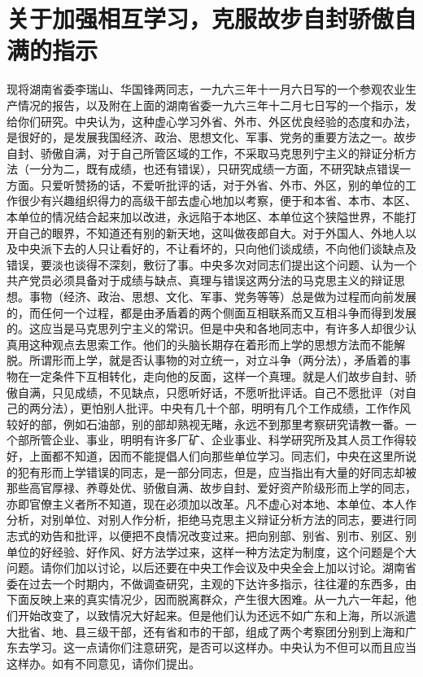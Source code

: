 \section[关于加强相互学习，克服故步自封骄傲自满的指示（一九六三年十二月十三日）]{关于加强相互学习，克服故步自封骄傲自满的指示}


现将湖南省委李瑞山、华国锋两同志，一九六三年十一月六日写的一个参观农业生产情况的报告，以及附在上面的湖南省委一九六三年十二月七日写的一个指示，发给你们研究。中央认为，这种虚心学习外省、外市、外区优良经验的态度和办法，是很好的，是发展我国经济、政治、思想文化、军事、党务的重要方法之一。故步自封、骄傲自满，对于自己所管区域的工作，不采取马克思列宁主义的辩证分析方法（一分为二，既有成绩，也还有错误），只研究成绩一方面，不研究缺点错误一方面。只爱听赞扬的话，不爱听批评的话，对于外省、外市、外区，别的单位的工作很少有兴趣组织得力的高级干部去虚心地加以考察，便于和本省、本市、本区、本单位的情况结合起来加以改进，永远陷于本地区、本单位这个狭隘世界，不能打开自己的眼界，不知道还有别的新天地，这叫做夜郎自大。对于外国人、外地人以及中央派下去的人只让看好的，不让看坏的，只向他们谈成绩，不向他们谈缺点及错误，要淡也谈得不深刻，敷衍了事。中央多次对同志们提出这个问题、认为一个共产党员必须具备对于成绩与缺点、真理与错误这两分法的马克思主义的辩证思想。事物（经济、政治、思想、文化、军事、党务等等）总是做为过程而向前发展的，而任何一个过程，都是由矛盾着的两个侧面互相联系而又互相斗争而得到发展的。这应当是马克思列宁主义的常识。但是中央和各地同志中，有许多人却很少认真用这种观点去思索工作。他们的头脑长期存在着形而上学的思想方法而不能解脱。所谓形而上学，就是否认事物的对立统一，对立斗争（两分法），矛盾着的事物在一定条件下互相转化，走向他的反面，这样一个真理。就是人们故步自封、骄傲自满，只见成绩，不见缺点，只愿听好话，不愿听批评话。自己不愿批评（对自己的两分法），更怕别人批评。中央有几十个部，明明有几个工作成绩，工作作风较好的部，例如石油部，别的部却熟视无睹，永远不到那里考察研究请教一番。一个部所管企业、事业，明明有许多厂矿、企业事业、科学研究所及其人员工作得较好，上面都不知道，因而不能提倡人们向那些单位学习。同志们，中央在这里所说的犯有形而上学错误的同志，是一部分同志，但是，应当指出有大量的好同志却被那些高官厚禄、养尊处优、骄傲自满、故步自封、爱好资产阶级形而上学的同志，亦即官僚主义者所不知道，现在必须加以改革。凡不虚心对本地、本单位、本人作分析，对别单位、对别人作分析，拒绝马克思主义辩证分析方法的同志，要进行同志式的劝告和批评，以便把不良情况改变过来。把向别部、别省、别市、别区、别单位的好经验、好作风、好方法学过来，这样一种方法定为制度，这个问题是个大问题。请你们加以讨论，以后还要在中央工作会议及中央全会上加以讨论。湖南省委在过去一个时期内，不做调查研究，主观的下达许多指示，往往灌的东西多，由下面反映上来的真实情况少，因而脱离群众，产生很大困难。从一九六一年起，他们开始改变了，以致情况大好起来。但是他们认为还远不如广东和上海，所以派遣大批省、地、县三级干部，还有省和市的干部，组成了两个考察团分别到上海和广东去学习。这一点请你们注意研究，是否可以这样办。中央认为不但可以而且应当这样办。如有不同意见，请你们提出。

